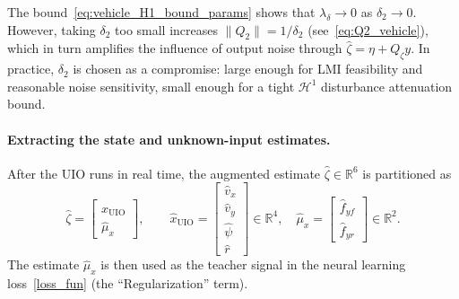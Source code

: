 \begin{remark}
The bound~\eqref{eq:vehicle_H1_bound_params} shows that $\lambda_\delta\to 0$ as $\delta_2\to 0$. However, taking $\delta_2$ too small increases $\|Q_2\|=1/\delta_2$ (see~\eqref{eq:Q2_vehicle}), which in turn amplifies the influence of output noise through $\hat{\zeta}=\eta+Q_\zeta y$. In practice, $\delta_2$ is chosen as a compromise: large enough for LMI feasibility and reasonable noise sensitivity, small enough for a tight $\mathcal{H}^1$ disturbance attenuation bound.
\end{remark}

\paragraph{Extracting the state and unknown-input estimates.}
After the UIO runs in real time, the augmented estimate $\hat{\zeta}\in\mathbb{R}^6$ is partitioned as
\begin{equation}\label{eq:vehicle_zeta_partition}
\hat{\zeta} = \begin{bmatrix} \hat{x}_{\text{UIO}} \\ \hat{\mu}_x \end{bmatrix}, \qquad
\hat{x}_{\text{UIO}} = \begin{bmatrix} \hat{v}_x \\ \hat{v}_y \\ \hat{\psi} \\ \hat{r} \end{bmatrix} \in \mathbb{R}^4, \quad
\hat{\mu}_x = \begin{bmatrix} \hat{f}_{yf} \\ \hat{f}_{yr} \end{bmatrix} \in \mathbb{R}^2.
\end{equation}
The estimate $\hat{\mu}_x$ is then used as the teacher signal in the neural learning loss~\eqref{loss_fun} (the ``Regularization'' term).

